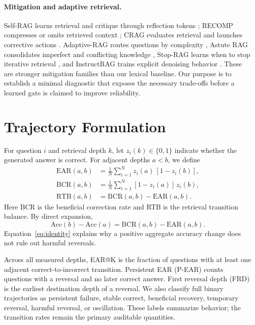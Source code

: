 \documentclass[10pt,twocolumn]{article}
\newcommand{\EAR}{\mathrm{EAR}}
\newcommand{\BCR}{\mathrm{BCR}}
\newcommand{\RTB}{\mathrm{RTB}}
\begin{document}
\paragraph{Mitigation and adaptive retrieval.}
Self-RAG learns retrieval and critique through reflection tokens \citep{asai2024selfrag}; RECOMP compresses or omits retrieved context \citep{xu2024recomp}; CRAG evaluates retrieval and launches corrective actions \citep{yan2024crag}. Adaptive-RAG routes questions by complexity \citep{jeong2024adaptive}, Astute RAG consolidates imperfect and conflicting knowledge \citep{wang2025astute}, Stop-RAG learns when to stop iterative retrieval \citep{park2025stoprag}, and InstructRAG trains explicit denoising behavior \citep{wei2024instructrag}. These are stronger mitigation families than our lexical baseline. Our purpose is to establish a minimal diagnostic that exposes the necessary trade-offs before a learned gate is claimed to improve reliability.

\section{Trajectory Formulation}

For question $i$ and retrieval depth $k$, let $z_i(k)\in\{0,1\}$ indicate whether the generated answer is correct. For adjacent depths $a<b$, we define
\begin{align}
\EAR(a,b) &= \frac{1}{N}\sum_{i=1}^{N} z_i(a)\,[1-z_i(b)],\\
\BCR(a,b) &= \frac{1}{N}\sum_{i=1}^{N} [1-z_i(a)]\,z_i(b),\\
\RTB(a,b) &= \BCR(a,b)-\EAR(a,b).
\end{align}
Here BCR is the beneficial correction rate and RTB is the retrieval transition balance. By direct expansion,
\begin{equation}
\mathrm{Acc}(b)-\mathrm{Acc}(a)=\BCR(a,b)-\EAR(a,b).
\label{eq:identity}
\end{equation}
Equation~\ref{eq:identity} explains why a positive aggregate accuracy change does not rule out harmful reversals.

Across all measured depths, EAR@K is the fraction of questions with at least one adjacent correct-to-incorrect transition. Persistent EAR (P-EAR) counts questions with a reversal and no later correct answer. First reversal depth (FRD) is the earliest destination depth of a reversal. We also classify full binary trajectories as persistent failure, stable correct, beneficial recovery, temporary reversal, harmful reversal, or oscillation. These labels summarize behavior; the transition rates remain the primary auditable quantities.
\end{document}
